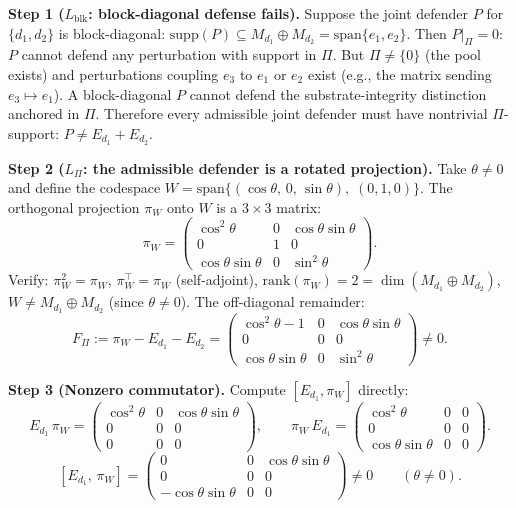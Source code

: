 \documentclass[11pt]{article}
\theoremstyle{remark}
\begin{document}
\smallskip\noindent\textbf{Step 1 ($L_{\mathrm{blk}}$: block-diagonal defense fails).}  Suppose the joint defender $P$ for $\{d_1, d_2\}$ is block-diagonal: $\mathrm{supp}(P) \subseteq M_{d_1} \oplus M_{d_2} = \mathrm{span}\{e_1, e_2\}$.  Then $P|_\Pi = 0$: $P$ cannot defend any perturbation with support in $\Pi$.  But $\Pi \ne \{0\}$ (the pool exists) and perturbations coupling $e_3$ to $e_1$ or $e_2$ exist (e.g., the matrix sending $e_3 \mapsto e_1$).  A block-diagonal $P$ cannot defend the substrate-integrity distinction anchored in $\Pi$.  Therefore every admissible joint defender must have nontrivial $\Pi$-support: $P \ne E_{d_1} + E_{d_2}$.

\smallskip\noindent\textbf{Step 2 ($L_\Pi$: the admissible defender is a rotated projection).}  Take $\theta \ne 0$ and define the codespace $W = \mathrm{span}\{(\cos\theta,\, 0,\, \sin\theta),\; (0,1,0)\}$.  The orthogonal projection $\pi_W$ onto $W$ is a $3\times 3$ matrix:
\[
\pi_W = \begin{pmatrix} \cos^2\!\theta & 0 & \cos\theta\sin\theta \\ 0 & 1 & 0 \\ \cos\theta\sin\theta & 0 & \sin^2\!\theta \end{pmatrix}.
\]
Verify: $\pi_W^2 = \pi_W$, $\pi_W^\top = \pi_W$ (self-adjoint), $\mathrm{rank}(\pi_W) = 2 = \dim(M_{d_1} \oplus M_{d_2})$, $W \ne M_{d_1} \oplus M_{d_2}$ (since $\theta \ne 0$).  The off-diagonal remainder:
\[
F_\Pi := \pi_W - E_{d_1} - E_{d_2} = \begin{pmatrix} \cos^2\!\theta - 1 & 0 & \cos\theta\sin\theta \\ 0 & 0 & 0 \\ \cos\theta\sin\theta & 0 & \sin^2\!\theta \end{pmatrix} \ne 0.
\]

\smallskip\noindent\textbf{Step 3 (Nonzero commutator).}  Compute $[E_{d_1}, \pi_W]$ directly:
\[
E_{d_1}\,\pi_W = \begin{pmatrix} \cos^2\!\theta & 0 & \cos\theta\sin\theta \\ 0 & 0 & 0 \\ 0 & 0 & 0 \end{pmatrix}, \qquad
\pi_W\, E_{d_1} = \begin{pmatrix} \cos^2\!\theta & 0 & 0 \\ 0 & 0 & 0 \\ \cos\theta\sin\theta & 0 & 0 \end{pmatrix}.
\]
\[
[E_{d_1},\, \pi_W] = \begin{pmatrix} 0 & 0 & \cos\theta\sin\theta \\ 0 & 0 & 0 \\ -\cos\theta\sin\theta & 0 & 0 \end{pmatrix} \ne 0 \qquad (\theta \ne 0).
\]
\end{document}
